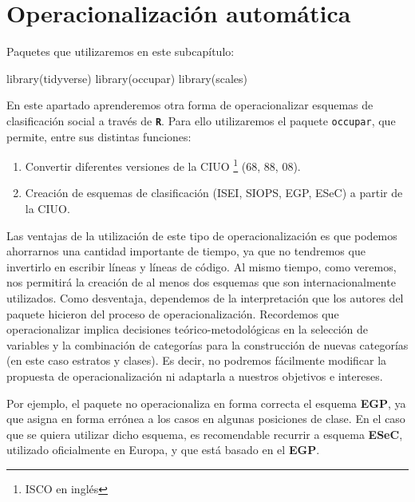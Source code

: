 \documentclass[
]{book}
\newenvironment{Shaded}{\begin{snugshade}}{\end{snugshade}}
\newcommand{\FunctionTok}[1]{\textcolor[rgb]{0.00,0.00,0.00}{#1}}
\newcommand{\NormalTok}[1]{#1}
\begin{document}
\hypertarget{operacion2}{%
\section{Operacionalización automática}\label{operacion2}}

Paquetes que utilizaremos en este subcapítulo:

\begin{Shaded}
\begin{Highlighting}[]
\FunctionTok{library}\NormalTok{(tidyverse)}
\FunctionTok{library}\NormalTok{(occupar)}
\FunctionTok{library}\NormalTok{(scales)}
\end{Highlighting}
\end{Shaded}

En este apartado aprenderemos otra forma de operacionalizar esquemas de clasificación social a través de \textbf{\texttt{R}}. Para ello utilizaremos el paquete \texttt{occupar}, que permite, entre sus distintas funciones:

\begin{enumerate}
\def\labelenumi{\arabic{enumi}.}
\item
  Convertir diferentes versiones de la CIUO \footnote{ISCO en inglés} (68, 88, 08).
\item
  Creación de esquemas de clasificación (ISEI, SIOPS, EGP, ESeC) a partir de la CIUO.
\end{enumerate}

Las ventajas de la utilización de este tipo de operacionalización es que podemos ahorrarnos una cantidad importante de tiempo, ya que no tendremos que invertirlo en escribir líneas y líneas de código. Al mismo tiempo, como veremos, nos permitirá la creación de al menos dos esquemas que son internacionalmente utilizados. Como desventaja, dependemos de la interpretación que los autores del paquete hicieron del proceso de operacionalización. Recordemos que operacionalizar implica decisiones teórico-metodológicas en la selección de variables y la combinación de categorías para la construcción de nuevas categorías (en este caso estratos y clases). Es decir, no podremos fácilmente modificar la propuesta de operacionalización ni adaptarla a nuestros objetivos e intereses.

Por ejemplo, el paquete no operacionaliza en forma correcta el esquema \textbf{EGP}, ya que asigna en forma errónea a los casos en algunas posiciones de clase. En el caso que se quiera utilizar dicho esquema, es recomendable recurrir a esquema \textbf{ESeC}, utilizado oficialmente en Europa, y que está basado en el \textbf{EGP}.
\end{document}
